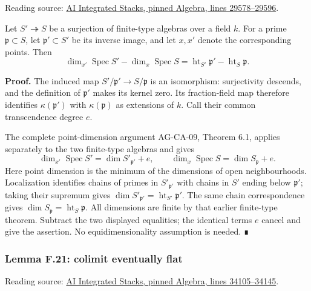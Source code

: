 \documentclass[11pt,a4paper,openany]{report}
\begin{document}
Reading source: \href{https://github.com/KokunoYumeto/unofficial-stacks-project-ai-drafts/blob/565b10e987aba5969b21145a0833f42d69f96790/algebra.tex\#L29578-L29596}{AI Integrated Stacks, pinned Algebra, lines 29578--29596}.

Let \(S'\twoheadrightarrow S\) be a surjection of finite-type algebras over a field \(k\). For a prime \(\mathfrak p\subset S\), let \(\mathfrak p'\subset S'\) be its inverse image, and let \(x,x'\) denote the corresponding points. Then \[\dim_{x'}\operatorname{Spec}S'-\dim_x\operatorname{Spec}S
=\operatorname{ht}_{S'}\mathfrak p'-\operatorname{ht}_S\mathfrak p.\]

\textbf{Proof.} The induced map \(S'/\mathfrak p'\to S/\mathfrak p\) is an isomorphism: surjectivity descends, and the definition of \(\mathfrak p'\) makes its kernel zero. Its fraction-field map therefore identifies \(\kappa(\mathfrak p')\) with \(\kappa(\mathfrak p)\) as extensions of \(k\). Call their common transcendence degree \(e\).

The complete point-dimension argument AG-CA-09, Theorem 6.1, applies separately to the two finite-type algebras and gives \[\dim_{x'}\operatorname{Spec}S'=\dim S'_{\mathfrak p'}+e,\qquad
\dim_x\operatorname{Spec}S=\dim S_{\mathfrak p}+e.\] Here point dimension is the minimum of the dimensions of open neighbourhoods. Localization identifies chains of primes in \(S'_{\mathfrak p'}\) with chains in \(S'\) ending below \(\mathfrak p'\); taking their supremum gives \(\dim S'_{\mathfrak p'}=\operatorname{ht}_{S'}\mathfrak p'\). The same chain correspondence gives \(\dim S_{\mathfrak p}=\operatorname{ht}_S\mathfrak p\). All dimensions are finite by that earlier finite-type theorem. Subtract the two displayed equalities; the identical terms \(e\) cancel and give the assertion. No equidimensionality assumption is needed. ∎

\label{AG-RG-S05-algebra-lemma-colimit-eventually-flat}

\subsubsection{Lemma F.21: colimit eventually flat}\label{AG-RG-S05-lemma-f.21-colimit-eventually-flat}

Reading source: \href{https://github.com/KokunoYumeto/unofficial-stacks-project-ai-drafts/blob/565b10e987aba5969b21145a0833f42d69f96790/algebra.tex\#L34105-L34145}{AI Integrated Stacks, pinned Algebra, lines 34105--34145}.
\end{document}
